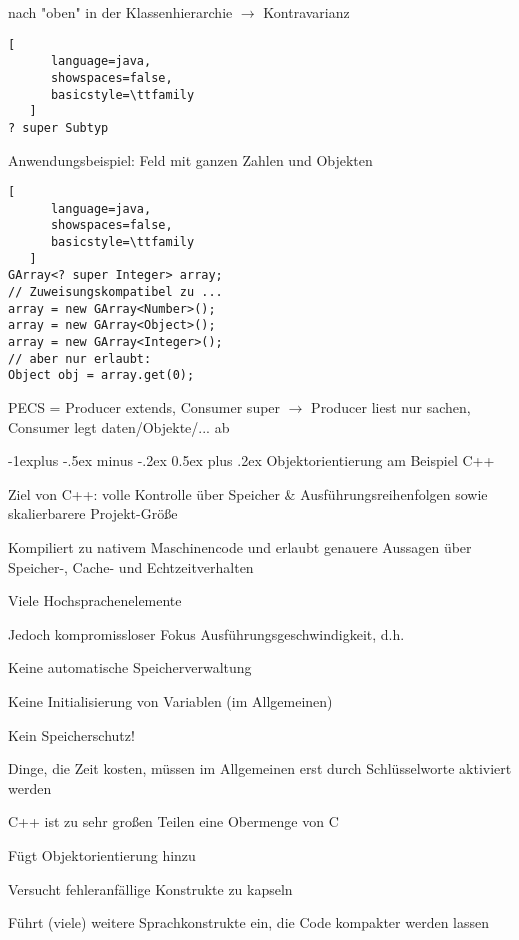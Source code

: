 \documentclass[10pt]{article}
\makeatletter
\renewcommand{\subsection}{\@startsection{subsection}{2}{0mm}%
                                {-1explus -.5ex minus -.2ex}%
                                {0.5ex plus .2ex}%
                                {\normalfont\normalsize\bfseries}}
\makeatother
\begin{document}
\begin{itemize*}
\begin{itemize*}
  \item nach "oben" in der Klassenhierarchie $\rightarrow$ Kontravarianz
  \begin{lstlisting}[
      language=java,
      showspaces=false,
      basicstyle=\ttfamily
   ]
? super Subtyp
\end{lstlisting}
  
  Anwendungsbeispiel: Feld mit ganzen Zahlen und Objekten
  \begin{lstlisting}[
      language=java,
      showspaces=false,
      basicstyle=\ttfamily
   ]
GArray<? super Integer> array;
// Zuweisungskompatibel zu ...
array = new GArray<Number>();
array = new GArray<Object>();
array = new GArray<Integer>();
// aber nur erlaubt:
Object obj = array.get(0);
\end{lstlisting}
  
\end{itemize*}

PECS = Producer extends, Consumer super $\rightarrow$ Producer liest nur sachen, Consumer legt daten/Objekte/... ab


\subsection{Objektorientierung am Beispiel C++}
\begin{itemize*}
  \item Ziel von C++: volle Kontrolle über Speicher \& Ausführungsreihenfolgen sowie skalierbarere Projekt-Größe
  \item Kompiliert zu nativem Maschinencode und erlaubt genauere Aussagen über Speicher-, Cache- und Echtzeitverhalten
  \item Viele Hochsprachenelemente
  \item Jedoch kompromissloser Fokus Ausführungsgeschwindigkeit, d.h.
  \begin{itemize*}
    \item Keine automatische Speicherverwaltung
    \item Keine Initialisierung von Variablen (im Allgemeinen)
    \item Kein Speicherschutz!
    \item Dinge, die Zeit kosten, müssen im Allgemeinen erst durch Schlüsselworte aktiviert werden
  \end{itemize*}
  \item C++ ist zu sehr großen Teilen eine Obermenge von C
  \begin{itemize*}
    \item Fügt Objektorientierung hinzu
    \item Versucht fehleranfällige Konstrukte zu kapseln
    \item Führt (viele) weitere Sprachkonstrukte ein, die Code kompakter werden lassen
  \end{itemize*}
\end{itemize*}


\end{itemize*}
\end{document}
